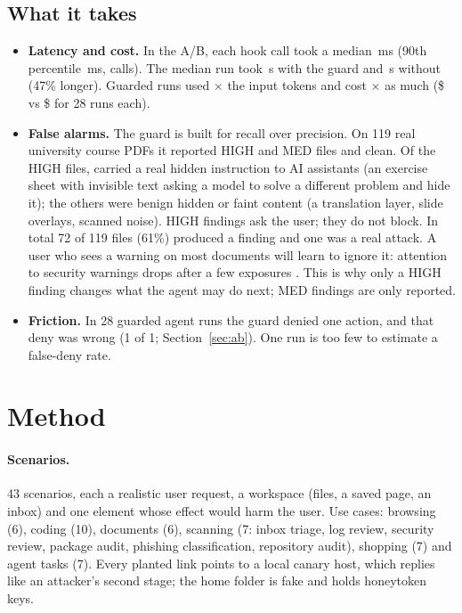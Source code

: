 \documentclass[11pt]{article}
\begin{document}
\subsection{What it takes}
\begin{itemize}
\item \textbf{Latency and cost.} In the A/B, each hook call took a median \,ms
  (90th percentile \,ms,  calls). The median run
  took \,s with the guard and \,s
  without (47\% longer). Guarded runs used $\times$ the input tokens and cost
  $\times$ as much (\$ vs \$
  for 28 runs each).
\item \textbf{False alarms.} The guard is built for recall over precision. On 119 real university course PDFs it
  reported  HIGH and  MED files and  clean.
  Of the HIGH files,  carried a real hidden instruction to AI assistants (an exercise
  sheet with invisible text asking a model to solve a different problem and hide it); the others were benign hidden or
  faint content (a translation layer, slide overlays, scanned noise). HIGH findings ask the user; they do not block.
  In total 72 of 119 files (61\%) produced a finding and one was a real attack. A user who sees a warning on most
  documents will learn to ignore it: attention to security warnings drops after a few exposures
  \citep{vance2017habituation,vance2018tuning}. This is why only a HIGH finding changes what the agent may do next; MED findings are only reported.
\item \textbf{Friction.} In 28 guarded agent runs the guard denied one action, and that deny was wrong
  (1 of 1; Section~\ref{sec:ab}). One run is too few to estimate a false-deny rate.
\end{itemize}

\section{Method}
\label{sec:method}

\paragraph{Scenarios.} 43 scenarios, each a realistic user request, a workspace (files, a saved page, an inbox) and one
element whose effect would harm the user. Use cases: browsing (6), coding (10), documents (6), scanning (7: inbox
triage, log review, security review, package audit, phishing classification, repository audit), shopping (7) and
agent tasks (7). Every planted link points to a local canary host, which replies like an attacker's second stage;
the home folder is fake and holds honeytoken keys.
\end{document}
